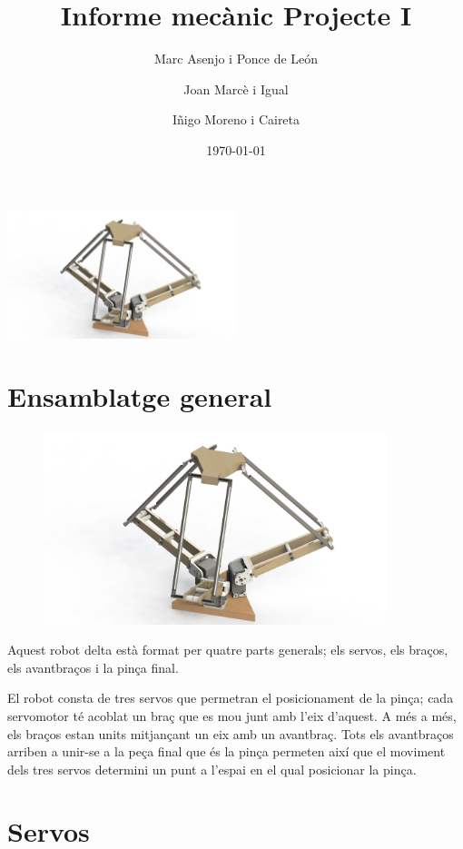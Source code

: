 \documentclass[a4paper, 10pt]{article}
\begin{document}
\title{Informe mecànic Projecte I}
\author{Marc Asenjo i Ponce de León \and
		Joan Marcè i Igual \and
		Iñigo Moreno i Caireta}
\date{\today}
\maketitle
\begin{center}
\includegraphics[width=0.5\textwidth]{./images/logo}
\end{center}

\newpage
\tableofcontents{}

\newpage
\section{Ensamblatge general}


\begin{figure}[h!]
\centering
\includegraphics[width=10cm]{./images/general}
\end{figure}

Aquest robot delta està format per quatre parts generals; els servos, els braços, els avantbraços i la pinça final. 

El robot consta de tres servos que permetran el posicionament de la pinça; cada servomotor té acoblat un braç que es mou junt amb l'eix d'aquest. A més a més, els
braços estan units mitjançant un eix amb un avantbraç. Tots els avantbraços arriben a unir-se a la peça final que és la pinça permeten així que el moviment dels tres servos determini un punt a l'espai en el qual posicionar la pinça.


\newpage
\section{Servos}
\end{document}
